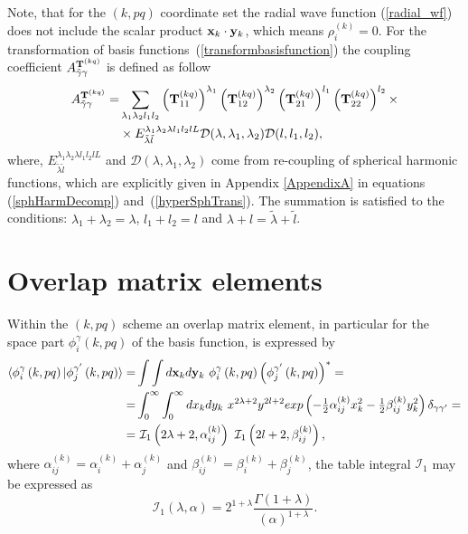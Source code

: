 \documentclass[
12pt, %
oneside, %
english, %
onehalfspacing, %
onehalfspacing, %
headsepline, %
]{MastersDoctoralThesis} %
\begin{document}
Note, that for the $(k,pq)$ coordinate set the radial wave function (\ref{radial_wf}) does not include the scalar product ${\bf x}_k \cdot {\bf y}_k$, which means $\rho_i^{(k)}=0$.  
 For the transformation of basis functions~(\ref{transformbasisfunction}) the coupling coefficient $A_{\tilde{\gamma} \gamma} ^{ {\bf T}^{(kq)}}$ is defined as follow 
 \begin{align}
 A_{\tilde{\gamma} \gamma} ^{ {\bf T}^{(kq)}} = & \sum_{\lambda_1 \lambda_2 l_1 l_2} 
\left({\bf T}_{11}^{(kq)} \right)^{\lambda_1} 
\left({\bf T}_{12}^{(kq)} \right)^{\lambda_2} 
\left({\bf T}_{21}^{(kq)} \right)^{l_1} 
\left({\bf T}_{22}^{(kq)} \right)^{l_2} 
\times \nonumber
\\
& \times {E}^{\lambda_1 \lambda_2 \lambda l_1 l_2 l L}_{\tilde{\lambda} \tilde{l} } \mathcal{D}(\lambda,\lambda_1,\lambda_2) \mathcal{D}(l,l_1,l_2),    
\label{trans_coef}
\end{align}
where, ${E}^{\lambda_1 \lambda_2 \lambda l_1 l_2 l L}_{\tilde{\lambda} \tilde{l} }$ and $\mathcal{D}(\lambda,\lambda_1,\lambda_2)$ come from re-coupling of spherical harmonic functions, which are explicitly given in Appendix \ref{AppendixA} in equations (\ref{sphHarmDecomp}) and~(\ref{hyperSphTrans}).
The summation is satisfied to the conditions: $\lambda_1+\lambda_2=\lambda$, $l_1+l_2=l$ and $\lambda+l=\tilde{\lambda}+\tilde{l}$.


\section{Overlap matrix elements}

Within the $\left(k, pq \right)$ scheme an overlap matrix element, in particular for the space part $ \phi_{i}^{\gamma}\left(k, pq \right)$ of the basis function, is expressed by
\begin{align}
\langle \phi_{i}^{\gamma}\left(k, pq \right) \vert 
\phi_{j}^{\gamma^{\prime}}\left(k, pq \right) \rangle=& \int \int d{\bf x}_k d{\bf y}_k ~\phi_{i}^{\gamma}\left(k, pq \right) \left( \phi_{j}^{\gamma^{\prime}}\left(k, pq \right) \right)^{*} =
\nonumber \\
=& \int_0^\infty \int_0^\infty  dx_k dy_k~ x^{2\lambda+2}y^{2 l +2} exp\left( - \tfrac{1}{2}\alpha^{(k)}_{ij} x^2_k - \tfrac{1}{2} \beta^{(k)}_{ij} y^2_k \right) \delta_{\gamma \gamma'} =
\nonumber \\
=&~ \mathcal{I}_1 \left( 2\lambda+2,\alpha_{ij}^{(k)} \right)~ \mathcal{I}_1 \left(2l+2,\beta_{ij}^{(k)} \right),
\end{align}
where 
$
\alpha_{ij}^{(k)}=\alpha_{i}^{(k)}+\alpha_{j}^{(k)}$ and $
\beta_{ij}^{(k)}=\beta_{i}^{(k)}+\beta_{j}^{(k)}
$,
the table integral $\mathcal{I}_1$ may be expressed as  
\begin{equation}
\mathcal{I}_1 \left( \lambda,\alpha\right)=
 2^{1+\lambda}\frac{\Gamma \left( 1+\lambda \right)  }{ \left( \alpha \right) ^{1+\lambda}} .
\label{table_integral_1}
\end{equation}
\end{document}
